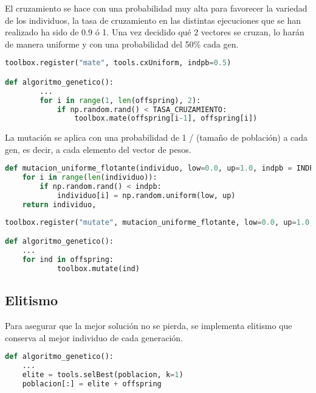 El cruzamiento se hace con una probabilidad muy alta para favorecer la variedad de los individuos, la tasa de cruzamiento en las distintas ejecuciones que se han realizado ha sido de 0.9 ó 1. Una vez decidido qué 2 vectores se cruzan, lo harán de manera uniforme y con una probabilidad del 50\% cada gen.

\begin{lstlisting}[language=Python, caption={Cruzamiento}, label={lst:codigo-python}]
toolbox.register("mate", tools.cxUniform, indpb=0.5)

def algoritmo_genetico():
        ...
        for i in range(1, len(offspring), 2):
            if np.random.rand() < TASA_CRUZAMIENTO:
                toolbox.mate(offspring[i-1], offspring[i])
\end{lstlisting}

La mutación se aplica con una probabilidad de 1 / (tamaño de población) a cada gen, es decir, a cada elemento del vector de pesos.
    
\begin{lstlisting}[language=Python, caption={Función mutación}, label={lst:codigo-python}]
def mutacion_uniforme_flotante(individuo, low=0.0, up=1.0, indpb = INDPB_MUTACION):
    for i in range(len(individuo)):
        if np.random.rand() < indpb:
            individuo[i] = np.random.uniform(low, up)
    return individuo,
\end{lstlisting}

\begin{lstlisting}[language=Python, caption={aplicación función mutación}, label={lst:codigo-python}]
toolbox.register("mutate", mutacion_uniforme_flotante, low=0.0, up=1.0, indpb=INDPB_MUTACION)

def algoritmo_genetico():
    ...
    for ind in offspring:
            toolbox.mutate(ind)
\end{lstlisting}

\subsection*{Elitismo}
Para asegurar que la mejor solución no se pierda, se implementa elitismo que conserva al mejor individuo de cada generación.

\begin{lstlisting}[language=Python, caption={Implementación elitismo}, label={lst:codigo-python}]
def algoritmo_genetico():
    ...
    elite = tools.selBest(poblacion, k=1)
    poblacion[:] = elite + offspring

\end{lstlisting}

